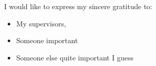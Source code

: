 

\begin{acknowledgement}

I would like to express my sincere gratitude to:

\begin{itemize}
 \item My supervisors,
 \vspace*{3mm}
 \item Someone important
 \vspace*{3mm}
 \item Someone else quite important I guess
 \vspace*{3mm}
\end{itemize}

\newpage
\end{acknowledgement}